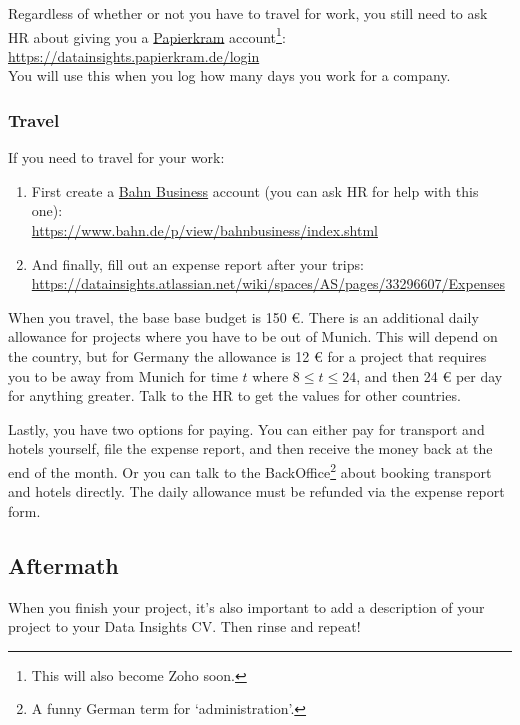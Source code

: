\documentclass[11pt]{report}
\begin{document}
Regardless of whether or not you have to travel for work, you still need to ask HR about giving you a \underline{Papierkram} account\footnote{This will also become Zoho soon.}:\\
\href{https://datainsights.papierkram.de/login}{https://datainsights.papierkram.de/login}\\
You will use this when you log how many days you work for a company.

\subsubsection{Travel}
If you need to travel for your work:
\begin{enumerate}
\item First create a \underline{Bahn Business} account (you can ask HR for help with this one):\\
\href{https://www.bahn.de/p/view/bahnbusiness/index.shtml}{https://www.bahn.de/p/view/bahnbusiness/index.shtml}
\item And finally, fill out an expense report after your trips:\\
\href{https://datainsights.atlassian.net/wiki/spaces/AS/pages/33296607/Expenses}{https://datainsights.atlassian.net/wiki/spaces/AS/pages/33296607/Expenses}
\end{enumerate}

When you travel, the base base budget is 150 \euro{}. There is an additional daily allowance for projects where you have to be out of Munich. This will depend on the country, but for Germany the allowance is 12 \euro{} for a project that requires you to be away from Munich for time $t$ where $8 \leq t \leq 24$, and then 24 \euro{} per day for anything greater. Talk to the HR to get the values for other countries.

Lastly, you have two options for paying. You can either pay for transport and hotels yourself, file the expense report, and then receive the money back at the end of the month. Or you can talk to the BackOffice\footnote{A funny German term for `administration'.} about booking transport and hotels directly. The daily allowance must be refunded via the expense report form.

\subsection{Aftermath}
When you finish your project, it's also important to add a description of your project to your Data Insights CV. Then rinse and repeat!
\end{document}
